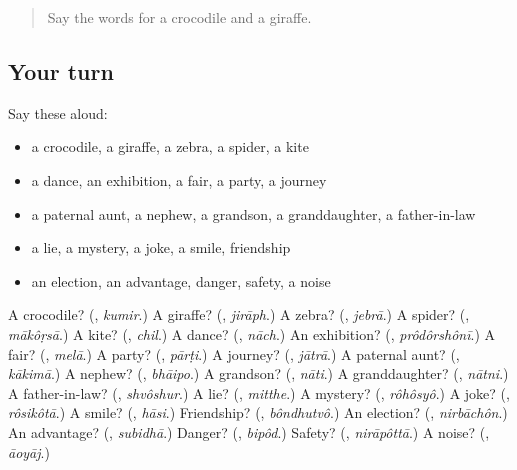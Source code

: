 \begin{quote}
Say the words for a crocodile and a giraffe.
\end{quote}

\subsection*{Your turn}
Say these aloud:

\begin{itemize}
\raggedright
  \item a crocodile, a giraffe, a zebra, a spider, a kite
  \item a dance, an exhibition, a fair, a party, a journey
  \item a paternal aunt, a nephew, a grandson, a granddaughter, a father-in-law
  \item a lie, a mystery, a joke, a smile, friendship
  \item an election, an advantage, danger, safety, a noise
\end{itemize}

\begin{tcolorbox}[breakable,colback=teal!4,colframe=teal!35!black,title={Before you move on}]
A crocodile? (\textbf{}, \emph{kumir}.) A giraffe? (\textbf{}, \emph{jirāph}.) A zebra? (\textbf{}, \emph{jebrā}.) A spider? (\textbf{}, \emph{mākôṛsā}.) A kite? (\textbf{}, \emph{chil}.) A dance? (\textbf{}, \emph{nāch}.) An exhibition? (\textbf{}, \emph{prôdôrshônī}.) A fair? (\textbf{}, \emph{melā}.) A party? (\textbf{}, \emph{pārṭi}.) A journey? (\textbf{}, \emph{jātrā}.) A paternal aunt? (\textbf{}, \emph{kākimā}.) A nephew? (\textbf{}, \emph{bhāipo}.) A grandson? (\textbf{}, \emph{nāti}.) A granddaughter? (\textbf{}, \emph{nātni}.) A father-in-law? (\textbf{}, \emph{shvôshur}.) A lie? (\textbf{}, \emph{mitthe}.) A mystery? (\textbf{}, \emph{rôhôsyô}.) A joke? (\textbf{}, \emph{rôsikôtā}.) A smile? (\textbf{}, \emph{hāsi}.) Friendship? (\textbf{}, \emph{bôndhutvô}.) An election? (\textbf{}, \emph{nirbāchôn}.) An advantage? (\textbf{}, \emph{subidhā}.) Danger? (\textbf{}, \emph{bipôd}.) Safety? (\textbf{}, \emph{nirāpôttā}.) A noise? (\textbf{}, \emph{āoyāj}.)
\end{tcolorbox}
